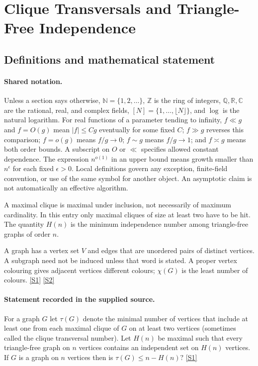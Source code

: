 \documentclass[11pt,a4paper]{article}
\newcommand{\N}{\mathbb{N}}
\newcommand{\Z}{\mathbb{Z}}
\newcommand{\Q}{\mathbb{Q}}
\newcommand{\R}{\mathbb{R}}
\newcommand{\C}{\mathbb{C}}
\newcommand{\sref}[2]{\hyperlink{source:#1:#2}{[S#2]}}
\begin{document}
\section{Clique Transversals and Triangle-Free Independence}\label{statement}


\subsection{Definitions and mathematical statement}

\paragraph{Shared notation.}Unless a section says otherwise, $\N=\{1,2,\ldots\}$,
$\Z$ is the ring of integers, $\Q,\R,\C$ are the rational, real, and complex
fields, $[N]=\{1,\ldots,\lfloor N\rfloor\}$, and $\log$ is the natural
logarithm. For real functions of a parameter tending to infinity,
$f\ll g$ and $f=O(g)$ mean $|f|\leq Cg$ eventually for some fixed $C$;
$f\gg g$ reverses this comparison; $f=o(g)$ means $f/g\to0$;
$f\sim g$ means $f/g\to1$; and $f\asymp g$ means both order bounds.
A subscript on $O$ or $\ll$ specifies allowed constant dependence.
The expression $n^{o(1)}$ in an upper bound means growth smaller than
$n^\epsilon$ for each fixed $\epsilon>0$. Local definitions govern any
exception, finite-field convention, or use of the same symbol for another
object. An asymptotic claim is not automatically an effective algorithm.



A maximal clique is maximal under inclusion, not necessarily of maximum cardinality. In this entry only maximal cliques of size at least two have to be hit. The quantity $H(n)$ is the minimum independence number among triangle-free graphs of order $n$.

A graph has a vertex set $V$ and edges that are unordered pairs of distinct vertices. A subgraph need not be induced unless that word is stated. A proper vertex colouring gives adjacent vertices different colours; $\chi(G)$ is the least number of colours. \sref{statement}{1} \sref{statement}{2}

\paragraph{Statement recorded in the supplied source.}
For a graph $G$ let $\tau(G)$ denote the minimal number of vertices that include at least one from each maximal clique of $G$ on at least two vertices (sometimes called the clique transversal number).
Let $H(n)$ be maximal such that every triangle-free graph on $n$ vertices contains an independent set on $H(n)$ vertices.
If $G$ is a graph on $n$ vertices then is $ \tau(G)\leq n-H(n)? $ \sref{statement}{1}
\end{document}
